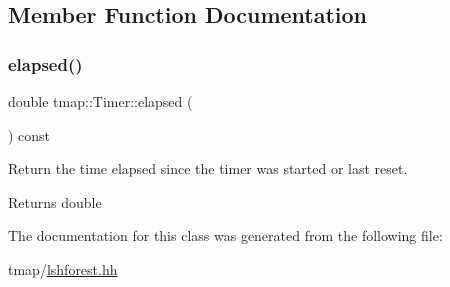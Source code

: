 \subsection{Member Function Documentation}
\mbox{\label{classtmap_1_1Timer_a34a0281aaced5d7768c5bc60ebcd0751}} 
\subsubsection{\texorpdfstring{elapsed()}{elapsed()}}
{\footnotesize\ttfamily double tmap\+::\+Timer\+::elapsed (\begin{DoxyParamCaption}{ }\end{DoxyParamCaption}) const\hspace{0.3cm}{\ttfamily [inline]}}



Return the time elapsed since the timer was started or last reset. 

\begin{DoxyReturn}{Returns}
double 
\end{DoxyReturn}


The documentation for this class was generated from the following file\+:\begin{DoxyCompactItemize}
\item 
tmap/\hyperlink{lshforest_8hh}{lshforest.\+hh}\end{DoxyCompactItemize}

